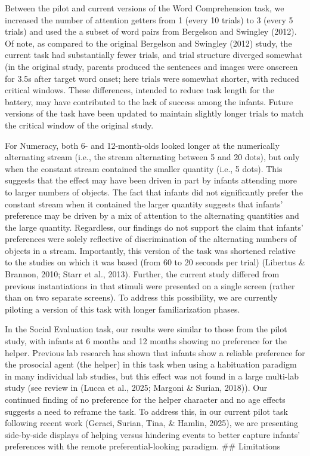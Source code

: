 \documentclass[
  english,
  man,floatsintext]{apa6}
\begin{document}
Between the pilot and current versions of the Word Comprehension task, we increased the number of attention getters from 1 (every 10 trials) to 3 (every 5 trials) and used the a subset of word pairs from Bergelson and Swingley (2012).
Of note, as compared to the original Bergelson and Swingley (2012) study, the current task had substantially fewer trials, and trial structure diverged somewhat (in the original study, parents produced the sentences and images were onscreen for 3.5s after target word onset; here trials were somewhat shorter, with reduced critical windows. These differences, intended to reduce task length for the battery, may have contributed to the lack of success among the infants. Future versions of the task have been updated to maintain slightly longer trials to match the critical window of the original study.

For Numeracy, both 6- and 12-month-olds looked longer at the numerically alternating stream (i.e., the stream alternating between 5 and 20 dots), but only when the constant stream contained the smaller quantity (i.e., 5 dots).
This suggests that the effect may have been driven in part by infants attending more to larger numbers of objects.
The fact that infants did not significantly prefer the constant stream when it contained the larger quantity suggests that infants' preference may be driven by a mix of attention to the alternating quantities and the large quantity.
Regardless, our findings do not support the claim that infants' preferences were solely reflective of discrimination of the alternating numbers of objects in a stream.
Importantly, this version of the task was shortened relative to the studies on which it was based (from 60 to 20 seconds per trial) (Libertus \& Brannon, 2010; Starr et al., 2013).
Further, the current study differed from previous instantiations in that stimuli were presented on a single screen (rather than on two separate screens).
To address this possibility, we are currently piloting a version of this task with longer familiarization phases.

In the Social Evaluation task, our results were similar to those from the pilot study, with infants at 6 months and 12 months showing no preference for the helper.
Previous lab research has shown that infants show a reliable preference for the prosocial agent (the helper) in this task when using a habituation paradigm in many individual lab studies, but this effect was not found in a large multi-lab study (see review in (Lucca et al., 2025; Margoni \& Surian, 2018)).
Our continued finding of no preference for the helper character and no age effects suggests a need to reframe the task.
To address this, in our current pilot task following recent work (Geraci, Surian, Tina, \& Hamlin, 2025), we are presenting side-by-side displays of helping versus hindering events to better capture infants' preferences with the remote preferential-looking paradigm.
\#\# Limitations
\end{document}
